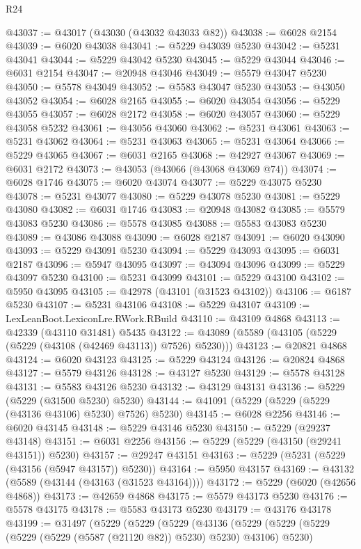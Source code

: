 \begin{lexlean}{R24}
\begin{coremodule}
@43037 := @43017 (@43030 (@43032 @43033 @82))
@43038 := @6028 @2154
@43039 := @6020 @43038
@43041 := @5229 @43039 @5230
@43042 := @5231 @43041
@43044 := @5229 @43042 @5230
@43045 := @5229 @43044
@43046 := @6031 @2154
@43047 := @20948 @43046
@43049 := @5579 @43047 @5230
@43050 := @5578 @43049
@43052 := @5583 @43047 @5230
@43053 := @43050 @43052
@43054 := @6028 @2165
@43055 := @6020 @43054
@43056 := @5229 @43055
@43057 := @6028 @2172
@43058 := @6020 @43057
@43060 := @5229 @43058 @5232
@43061 := @43056 @43060
@43062 := @5231 @43061
@43063 := @5231 @43062
@43064 := @5231 @43063
@43065 := @5231 @43064
@43066 := @5229 @43065
@43067 := @6031 @2165
@43068 := @42927 @43067
@43069 := @6031 @2172
@43073 := @43053 (@43066 (@43068 @43069 @74))
@43074 := @6028 @1746
@43075 := @6020 @43074
@43077 := @5229 @43075 @5230
@43078 := @5231 @43077
@43080 := @5229 @43078 @5230
@43081 := @5229 @43080
@43082 := @6031 @1746
@43083 := @20948 @43082
@43085 := @5579 @43083 @5230
@43086 := @5578 @43085
@43088 := @5583 @43083 @5230
@43089 := @43086 @43088
@43090 := @6028 @2187
@43091 := @6020 @43090
@43093 := @5229 @43091 @5230
@43094 := @5229 @43093
@43095 := @6031 @2187
@43096 := @5947 @43095
@43097 := @43094 @43096
@43099 := @5229 @43097 @5230
@43100 := @5231 @43099
@43101 := @5229 @43100
@43102 := @5950 @43095
@43105 := @42978 (@43101 (@31523 @43102))
@43106 := @6187 @5230
@43107 := @5231 @43106
@43108 := @5229 @43107
@43109 := LexLeanBoot.LexiconLre.RWork.RBuild
@43110 := @43109 @4868
@43113 := @42339 (@43110 @31481) @5435
@43122 := @43089 (@5589 (@43105 (@5229 (@5229 (@43108 (@42469 @43113)) @7526) @5230)))
@43123 := @20821 @4868
@43124 := @6020 @43123
@43125 := @5229 @43124
@43126 := @20824 @4868
@43127 := @5579 @43126
@43128 := @43127 @5230
@43129 := @5578 @43128
@43131 := @5583 @43126 @5230
@43132 := @43129 @43131
@43136 := @5229 (@5229 (@31500 @5230) @5230)
@43144 := @41091 (@5229 (@5229 (@5229 (@43136 @43106) @5230) @7526) @5230)
@43145 := @6028 @2256
@43146 := @6020 @43145
@43148 := @5229 @43146 @5230
@43150 := @5229 (@29237 @43148)
@43151 := @6031 @2256
@43156 := @5229 (@5229 (@43150 (@29241 @43151)) @5230)
@43157 := @29247 @43151
@43163 := @5229 (@5231 (@5229 (@43156 (@5947 @43157)) @5230))
@43164 := @5950 @43157
@43169 := @43132 (@5589 (@43144 (@43163 (@31523 @43164))))
@43172 := @5229 (@6020 (@42656 @4868))
@43173 := @42659 @4868
@43175 := @5579 @43173 @5230
@43176 := @5578 @43175
@43178 := @5583 @43173 @5230
@43179 := @43176 @43178
@43199 := @31497
    (@5229
      (@5229
        (@5229
          (@43136
            (@5229
              (@5229 (@5229 (@5229 (@5229 (@5587 (@21120 @82)) @5230) @5230) @43106) @5230)

\end{coremodule}
\end{lexlean}
